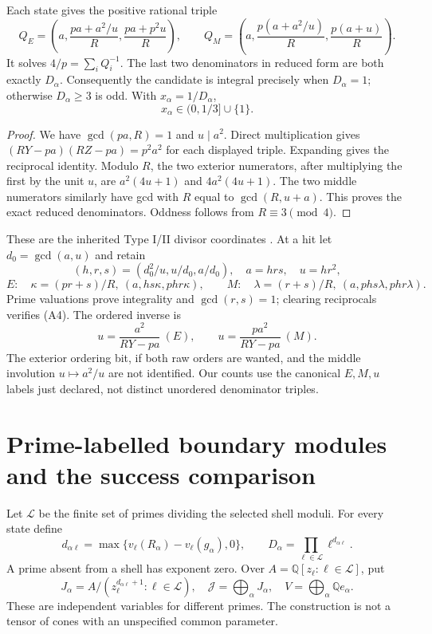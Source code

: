 \begin{lemma}
Each state gives the positive rational triple
\[
 Q_E=\left(a,\frac{pa+a^2/u}{R},\frac{pa+p^2u}{R}\right),\qquad
 Q_M=\left(a,\frac{p(a+a^2/u)}R,\frac{p(a+u)}R\right).
 \tag{A2}
\]
It solves $4/p=\sum_iQ_i^{-1}$. The last two denominators in reduced form are
both exactly $D_\alpha$. Consequently the candidate is integral precisely when
$D_\alpha=1$; otherwise $D_\alpha\ge3$ is odd. With $x_\alpha=1/D_\alpha$,
\[
 x_\alpha\in(0,1/3]\cup\{1\}.
 \tag{A3}
\]
\end{lemma}
\begin{proof}
We have $\gcd(pa,R)=1$ and $u\mid a^2$. Direct multiplication gives
$(RY-pa)(RZ-pa)=p^2a^2$ for each displayed triple. Expanding gives the
reciprocal identity. Modulo $R$, the two exterior numerators, after multiplying
the first by the unit $u$, are $a^2(4u+1)$ and $4a^2(4u+1)$. The two middle
numerators similarly have gcd with $R$ equal to $\gcd(R,u+a)$. This proves the
exact reduced denominators. Oddness follows from $R\equiv3\pmod4$.
\end{proof}

These are the inherited Type I/II divisor coordinates \cite{ET}. At a hit let
$d_0=\gcd(a,u)$ and retain
\[
 (h,r,s)=(d_0^2/u,u/d_0,a/d_0),\quad a=hrs,\quad u=hr^2,
\]
\[
 E:\quad\kappa=(pr+s)/R,\ (a,hs\kappa,phr\kappa),\qquad
 M:\quad\lambda=(r+s)/R,\ (a,phs\lambda,phr\lambda).
 \tag{A4}
\]
Prime valuations prove integrality and $\gcd(r,s)=1$; clearing reciprocals
verifies (A4). The ordered inverse is
\[
 u=\frac{a^2}{RY-pa}\ (E),\qquad
 u=\frac{pa^2}{RY-pa}\ (M).
 \tag{A5}
\]
The exterior ordering bit, if both raw orders are wanted, and the middle
involution $u\mapsto a^2/u$ are not identified. Our counts use the canonical
$E,M,u$ labels just declared, not distinct unordered denominator triples.

\section{Prime-labelled boundary modules and the success comparison}
Let $\mathcal L$ be the finite set of primes dividing the selected shell
moduli. For every state define
\[
 d_{\alpha\ell}=\max\{v_\ell(R_\alpha)-v_\ell(g_\alpha),0\},\qquad
 D_\alpha=\prod_{\ell\in\mathcal L}\ell^{d_{\alpha\ell}}.
 \tag{B1}
\]
A prime absent from a shell has exponent zero. Over
$A=\mathbb Q[z_\ell:\ell\in\mathcal L]$, put
\[
 J_\alpha=A/(z_\ell^{d_{\alpha\ell}+1}:\ell\in\mathcal L),\quad
 \mathcal J=\bigoplus_\alpha J_\alpha,\quad
 V=\bigoplus_\alpha\mathbb Q e_\alpha.
 \tag{B2}
\]
These are independent variables for different primes. The construction is
not a tensor of cones with an unspecified common parameter.

